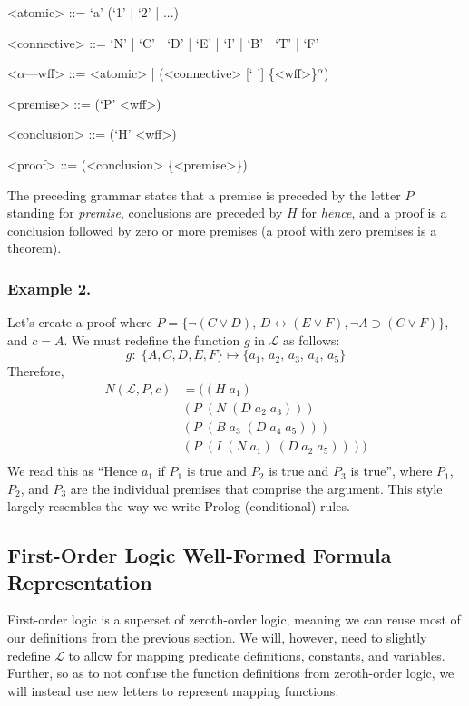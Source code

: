 \documentclass[ms]{uncgdissertationexp2}
\theoremstyle{plain}
\theoremstyle{definition}
\theoremstyle{remark}
\begin{document}
\begin{grammar}
	<atomic> ::= `a' (`1' | `2' | ...)
	
	<connective> ::= `N' | `C' | `D' | `E' | `I' | `B' | `T' | `F' 
	
	<$\alpha$---wff> ::= <atomic> | (<connective> [` '] \{<wff>\}$^{\alpha}$)
	
	<premise> ::= (`P' <wff>)
	
	<conclusion> ::= (`H' <wff>)
	
	<proof> ::= (<conclusion> \{<premise>\})
\end{grammar}

The preceding grammar states that a premise is preceded by the letter $P$ standing for \textit{premise}, conclusions are preceded by $H$ for \textit{hence}, and a proof is a conclusion followed by zero or more premises (a proof with zero premises is a theorem).\\

\subsubsection{Example 2.}
Let's create a proof where $P = \{\lnot(C \lor D),\,D \leftrightarrow (E \lor F), \lnot A \supset (C \lor F)\}$, and $c = A$. We must redefine the function $g$ in $\mathcal{L}$ as follows:
\[
	g:\;\{A, C, D, E, F\} \mapsto \{a_1,\,a_2,\,a_3,\,a_4,\,a_5\}
\]
\noindent Therefore, 
\begin{align*}
	N(\mathcal{L}, P, c) & = ((H\;a_1)\;                      \\
	                     & (P\;(N\;(D\;a_2\;a_3)))            \\
	                     & (P\;(B\;a_3\;(D\;a_4\;a_5)))       \\
	                     & (P\;(I\;(N\;a_1)\;(D\;a_2\;a_5)))) \\
\end{align*}
We read this as ``Hence $a_1$ if $P_1$ is true and $P_2$ is true and $P_3$ is true'', where $P_1$, $P_2$, and $P_3$ are the individual premises that comprise the argument. This style largely resembles the way we write Prolog (conditional) rules. 
\subsection{First-Order Logic Well-Formed Formula Representation}

First-order logic is a superset of zeroth-order logic, meaning we can reuse most of our definitions from the previous section. We will, however, need to slightly redefine $\mathcal{L}$ to allow for mapping predicate definitions, constants, and variables. Further, so as to not confuse the function definitions from zeroth-order logic, we will instead use new letters to represent mapping functions.
\end{document}
